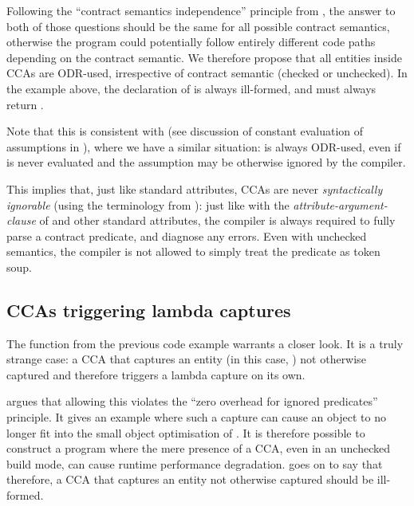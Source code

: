 Following the ``contract semantics independence'' principle from \cite{P2834R1}, the answer to both of those questions should be the same for all possible contract semantics, otherwise the program could potentially follow entirely different code paths depending on the contract semantic. We therefore propose that all entities inside CCAs are ODR-used, irrespective of contract semantic (checked or unchecked). In the example above, the declaration of  is always ill-formed, and  must always return .

Note that this is consistent with  (see discussion of constant evaluation of assumptions in \cite{P1774R8}), where we have a similar situation:  is always ODR-used, even if  is never evaluated and the assumption may be otherwise ignored by the compiler.

This implies that, just like standard attributes, CCAs are never \emph{syntactically ignorable} (using the terminology from \cite{P2552R2}): just like with the \emph{attribute-argument-clause} of  and other standard attributes, the compiler is always required to fully parse a contract predicate, and diagnose any errors. Even with unchecked semantics, the compiler is not allowed to simply treat the predicate as token soup.

\subsection{CCAs triggering lambda captures}

The function  from the previous code example warrants a closer look. It is a truly strange case: a CCA that captures an entity (in this case, ) not otherwise captured and therefore triggers a lambda capture on its own.

\cite{P2834R1} argues that allowing this violates the ``zero overhead for ignored predicates'' principle. It gives an example where such a capture can cause an object to no longer fit into the small object optimisation of . It is therefore possible to construct a program where the mere presence of a CCA, even in an unchecked build mode, can cause runtime performance degradation. \cite{P2834R1} goes on to say that therefore, a CCA that captures an entity not otherwise captured should be ill-formed.

